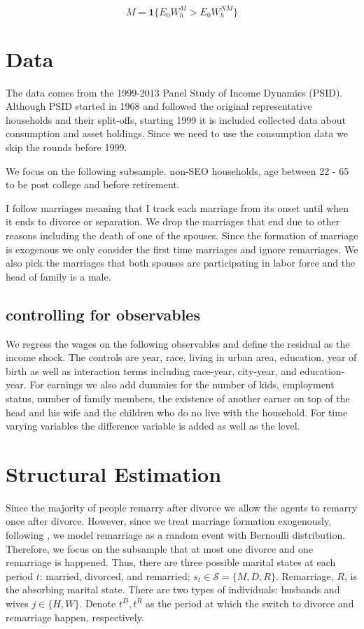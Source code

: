 \begin{equation*}
M = \mathbf 1\{E_0 W_h^M > E_0 W_h^{NM}\}
\end{equation*}
  

\section{Data}
The data comes from the 1999-2013 Panel Study of Income Dynamics (PSID). Although PSID started in 1968 and followed the original representative households and their split-offs, starting 1999 it is included collected data about consumption and asset holdings. Since we need to use the consumption data we skip the rounds before 1999. 

We focus on the following subsample. non-SEO households, age between 22 - 65 to be post college and before retirement. 

I follow marriages meaning that I track each marriage from its onset until when it ends to divorce or separation. We drop the marriages that end due to other reasons including the death of one of the spouses. Since the formation of marriage is exogenous we only consider the first time marriages and ignore remarriages.  We also pick the marriages that both spouses are participating in labor force and the head of family is a male.\\



\subsection{controlling for observables}
We regress the wages on the following observables and define the residual as the income shock. The controls are year, race, living in urban area, education, year of birth as well as interaction terms including race-year, city-year, and education-year. For earnings we also add dummies for the number of kids, employment status, number of family members, the existence of another earner on top of the head and his wife and the children who do no live with the household. For time varying variables the difference variable is added as well as the level. 

\section{Structural Estimation}

Since the majority of people remarry after divorce we allow the agents to remarry once after divorce. However, since we treat marriage formation exogenously,  following \citet{Voena_2015}, we model remarriage as a random event with Bernoulli distribution. Therefore, we focus on the subsample that at most one divorce and one remarriage is happened. Thus, there are three possible marital states at each period $t$: married, divorced, and remarried; $s_t \in \mathcal S = \{M, D, R \}$. Remarriage, $R$,  is the absorbing marital state.  There are two types of individuals: husbands and wives $j \in \{ H, W\}$. Denote $t^D, t^R$ as the period at which the switch to divorce and remarriage happen, respectively. \\


